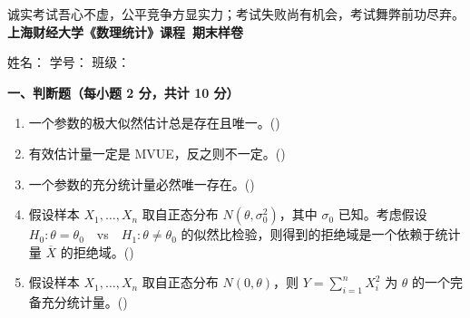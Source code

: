 \documentclass[12pt,a4paper]{ctexart}
\newcommand{\question}[1]{\bigskip\noindent\textbf{#1}\par\nobreak\medskip}
\begin{document}
\begin{center}
  {\small 诚实考试吾心不虚，公平竞争方显实力；考试失败尚有机会，考试舞弊前功尽弃。}\\[2mm]
  {\LARGE\bfseries 上海财经大学《数理统计》课程\ 期末样卷}
\end{center}

\vspace{2mm}
\noindent
姓名：\underline{\hspace{2.6cm}}\hfill
学号：\underline{\hspace{2.6cm}}\hfill
班级：\underline{\hspace{2.6cm}}

\vspace{3mm}

\question{一、判断题（每小题 2 分，共计 10 分）}
\begin{enumerate}[label=\arabic*.,leftmargin=2.2em]
  \item 一个参数的极大似然估计总是存在且唯一。\hfill(\underline{\hspace{1.2cm}})
  \item 有效估计量一定是 MVUE，反之则不一定。\hfill(\underline{\hspace{1.2cm}})
  \item 一个参数的充分统计量必然唯一存在。\hfill(\underline{\hspace{1.2cm}})
  \item 假设样本 $X_{1},\ldots,X_{n}$ 取自正态分布 $N(\theta,\sigma_{0}^{2})$，其中 $\sigma_{0}$ 已知。考虑假设 $H_{0}:\theta=\theta_{0}$\ \ vs\ \ $H_{1}:\theta\neq\theta_{0}$ 的似然比检验，则得到的拒绝域是一个依赖于统计量 $\overline{X}$ 的拒绝域。\hfill(\underline{\hspace{1.2cm}})
  \item 假设样本 $X_{1},\ldots,X_{n}$ 取自正态分布 $N(0,\theta)$，则 $Y=\sum_{i=1}^{n}X_{i}^{2}$ 为 $\theta$ 的一个完备充分统计量。\hfill(\underline{\hspace{1.2cm}})
\end{enumerate}
\end{document}

